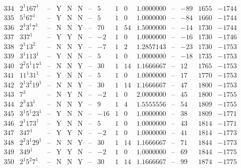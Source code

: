 \documentclass[11pt,reqno,a4letter]{article}
\numberwithin{figure}{section}
\numberwithin{table}{section}
\theoremstyle{plain}
\numberwithin{theorem}{section}
\theoremstyle{definition}
\newcommand{\NBRef}[1]{}
\begin{document}
\begin{table}[h!]
\begin{equation*}
{\begin{array}{|cc|c|ccc|c|c|ccc|c|ccc}
 334 & 2^1 167^1 & \text{--} & \text{Y} & \text{N} & \text{N} & \text{--} & 5 & 1 & 0 & 1.0000000 & \text{--} & -89 & 1655 & -1744 \\
 335 & 5^1 67^1 & \text{--} & \text{Y} & \text{N} & \text{N} & \text{--} & 5 & 1 & 0 & 1.0000000 & \text{--} & -84 & 1660 & -1744 \\
 336 & 2^4 3^1 7^1 & \text{--} & \text{N} & \text{N} & \text{Y} & \text{--} & 70 & 1 & 54 & 1.5000000 & \text{--} & -14 & 1730 & -1744 \\
 337 & 337^1 & \text{--} & \text{Y} & \text{Y} & \text{N} & \text{--} & -2 & 1 & 0 & 1.0000000 & \text{--} & -16 & 1730 & -1746 \\
 338 & 2^1 13^2 & \text{--} & \text{N} & \text{N} & \text{Y} & \text{--} & -7 & 1 & 2 & 1.2857143 & \text{--} & -23 & 1730 & -1753 \\
 339 & 3^1 113^1 & \text{--} & \text{Y} & \text{N} & \text{N} & \text{--} & 5 & 1 & 0 & 1.0000000 & \text{--} & -18 & 1735 & -1753 \\
 340 & 2^2 5^1 17^1 & \text{--} & \text{N} & \text{N} & \text{Y} & \text{--} & 30 & 1 & 14 & 1.1666667 & \text{--} & 12 & 1765 & -1753 \\
 341 & 11^1 31^1 & \text{--} & \text{Y} & \text{N} & \text{N} & \text{--} & 5 & 1 & 0 & 1.0000000 & \text{--} & 17 & 1770 & -1753 \\
 342 & 2^1 3^2 19^1 & \text{--} & \text{N} & \text{N} & \text{Y} & \text{--} & 30 & 1 & 14 & 1.1666667 & \text{--} & 47 & 1800 & -1753 \\
 343 & 7^3 & \text{--} & \text{N} & \text{Y} & \text{N} & \text{--} & -2 & 1 & 0 & 2.0000000 & \text{--} & 45 & 1800 & -1755 \\
 344 & 2^3 43^1 & \text{--} & \text{N} & \text{N} & \text{Y} & \text{--} & 9 & 1 & 4 & 1.5555556 & \text{--} & 54 & 1809 & -1755 \\
 345 & 3^1 5^1 23^1 & \text{--} & \text{Y} & \text{N} & \text{N} & \text{--} & -16 & 1 & 0 & 1.0000000 & \text{--} & 38 & 1809 & -1771 \\
 346 & 2^1 173^1 & \text{--} & \text{Y} & \text{N} & \text{N} & \text{--} & 5 & 1 & 0 & 1.0000000 & \text{--} & 43 & 1814 & -1771 \\
 347 & 347^1 & \text{--} & \text{Y} & \text{Y} & \text{N} & \text{--} & -2 & 1 & 0 & 1.0000000 & \text{--} & 41 & 1814 & -1773 \\
 348 & 2^2 3^1 29^1 & \text{--} & \text{N} & \text{N} & \text{Y} & \text{--} & 30 & 1 & 14 & 1.1666667 & \text{--} & 71 & 1844 & -1773 \\
 349 & 349^1 & \text{--} & \text{Y} & \text{Y} & \text{N} & \text{--} & -2 & 1 & 0 & 1.0000000 & \text{--} & 69 & 1844 & -1775 \\
 350 & 2^1 5^2 7^1 & \text{--} & \text{N} & \text{N} & \text{Y} & \text{--} & 30 & 1 & 14 & 1.1666667 & \text{--} & 99 & 1874 & -1775 \\
\end{array}
}
\end{equation*}

\end{table} 


\newpage
\setcounter{section}{0}
\renewcommand{\thesection}{Appendix \Alph{section}}
\renewcommand{\thesubsection}{\Alph{section}.\arabic{subsection}}
\end{document}
